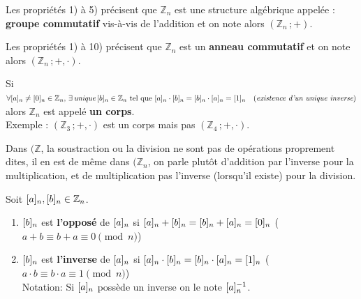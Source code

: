 \medskip

\begin{remarques}
	\item Les propriétés 1) à 5) précisent que $\mathbb{Z}_n$ est une structure algébrique appelée : \\
	\textbf{groupe commutatif} vis-à-vis de l'addition et on note alors $(\mathbb{Z}_n\, ; +)$.
	
	\item Les propriétés 1) à 10) précisent que $\mathbb{Z}_n$ est un \textbf{anneau commutatif} et on note alors $(\mathbb{Z}_n\, ; +, \cdot)$.
	
	\item Si $\forall [a]_{n} \neq [0]_{n} \in \mathbb{Z}_n, \, \exists\,\text{\textit{unique}} \, [b]_{n} \in \mathbb{Z}_n \text{ tel que } [a]_{n} \cdot [b]_{n} = [b]_{n} \cdot [a]_{n} = [1]_{n} \quad (\textit{existence d'un unique inverse})$ \\
	alors $\mathbb{Z}_n$ est appelé \textbf{un corps}. \\
	Exemple : $(\mathbb{Z}_3\, ; +, \cdot)$ est un corps mais pas $(\mathbb{Z}_4\, ; +, \cdot)$.
\end{remarques}

\medskip

Dans $(\mathbb{Z}$, la soustraction ou la division ne sont pas de opérations proprement dites, il en est de même dans $(\mathbb{Z}_n$, on parle plutôt d'addition par l'inverse pour la multiplication, et de multiplication pas l'inverse (lorsqu'il existe) pour la division.

\medskip

\begin{definition}
Soit $[a]_{n}, [b]_{n} \in \mathbb{Z}_n$.

\begin{enumerate}[label=\textbf{\arabic*)}, leftmargin=*]
	\item $[b]_{n}$ est \textbf{l'opposé} de $[a]_{n}$ si $[a]_{n} + [b]_{n} = [b]_{n} + [a]_{n} = [0]_{n}$ \hfill ($a + b \equiv b + a \equiv 0 \pmod n$)
	\item $[b]_{n}$ est \textbf{l'inverse} de $[a]_{n}$ si $[a]_{n} \cdot [b]_{n} = [b]_{n} \cdot [a]_{n} = [1]_{n}$ \hfill ($a \cdot b \equiv b \cdot a \equiv 1 \pmod n$)\\
	Notation: Si $[a]_{n}$ possède un inverse on le note $[a]_{n}^{-1}$.
\end{enumerate}
	
\end{definition}

